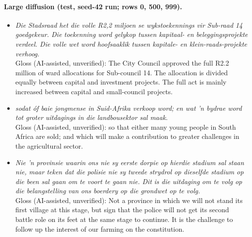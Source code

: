 \documentclass[11pt,a4paper]{article}
\begin{document}
\paragraph{Large diffusion (test, seed-42 run; rows 0, 500, 999).}
\begin{itemize}\small
\item[0] \emph{Die Stadsraad het die volle R2,2 miljoen se wykstoekennings vir Sub-raad 14 goedgekeur. Die toekenning word gelykop tussen kapitaal- en beleggingsprojekte verdeel. Die volle wet word hoofsaaklik tussen kapitale- en klein-raads-projekte verhoog.}\\
Gloss (AI-assisted, unverified): The City Council approved the full R2.2 million of ward allocations for Sub-council 14. The allocation is divided equally between capital and investment projects. The full act is mainly increased between capital and small-council projects.
\item[500] \emph{sodat óf baie jongmense in Suid-Afrika verkoop word; en wat 'n bydrae word tot groter uitdagings in die landbousektor sal maak.}\\
Gloss (AI-assisted, unverified): so that either many young people in South Africa are sold; and which will make a contribution to greater challenges in the agricultural sector.
\item[999] \emph{Nie 'n provinsie waarin ons nie sy eerste dorpie op hierdie stadium sal staan nie, maar teken dat die polisie nie sy tweede strydrol op dieselfde stadium op die been sal gaan om te voort te gaan nie. Dit is die uitdaging om te volg op die belangstelling van ons boerdery op die grondwet op te volg.}\\
Gloss (AI-assisted, unverified): Not a province in which we will not stand its first village at this stage, but sign that the police will not get its second battle role on its feet at the same stage to continue. It is the challenge to follow up the interest of our farming on the constitution.
\end{itemize}
\end{document}
